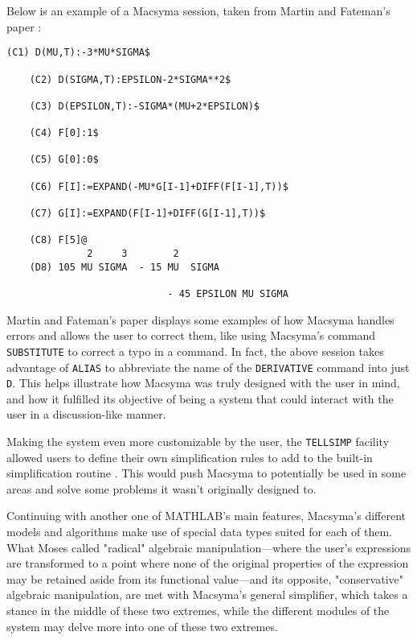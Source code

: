 Below is an example of a Macsyma session, taken from Martin and Fateman's paper \parencite*{martin1971macsyma}:

\begin{lstlisting}[caption={Example of a Macsyma session.},label={lst:example-macsyma-session},numbers=none]
    (C1) D(MU,T):-3*MU*SIGMA$
    
    (C2) D(SIGMA,T):EPSILON-2*SIGMA**2$

    (C3) D(EPSILON,T):-SIGMA*(MU+2*EPSILON)$

    (C4) F[0]:1$

    (C5) G[0]:0$

    (C6) F[I]:=EXPAND(-MU*G[I-1]+DIFF(F[I-1],T))$

    (C7) G[I]:=EXPAND(F[I-1]+DIFF(G[I-1],T))$

    (C8) F[5]@
              2     3        2
    (D8) 105 MU SIGMA  - 15 MU  SIGMA

                            - 45 EPSILON MU SIGMA
\end{lstlisting}

Martin and Fateman's paper displays some examples of how Macsyma handles errors and allows the user to correct them, like using Macsyma's command \verb|SUBSTITUTE| to correct a typo in a command. In fact, the above session takes advantage of \verb|ALIAS| to abbreviate the name of the \verb|DERIVATIVE| command into just \verb|D|. This helps illustrate how Macsyma was truly designed with the user in mind, and how it fulfilled its objective of being a system that could interact with the user in a discussion-like manner.

Making the system even more customizable by the user, the \verb|TELLSIMP| facility allowed users to define their own simplification rules to add to the built-in simplification routine \parencite{martin1971macsyma}. This would push Macsyma to potentially be used in some areas and solve some problems it wasn't originally designed to.

Continuing with another one of MATHLAB's main features, Macsyma's different models and algorithms make use of special data types suited for each of them. What Moses \parencite*{moses1971algebraic} called "radical" algebraic manipulation---where the user's expressions are transformed to a point where none of the original properties of the expression may be retained aside from its functional value---and its opposite, "conservative" algebraic manipulation, are met with Macsyma's general simplifier, which takes a stance in the middle of these two extremes, while the different modules of the system may delve more into one of these two extremes.

